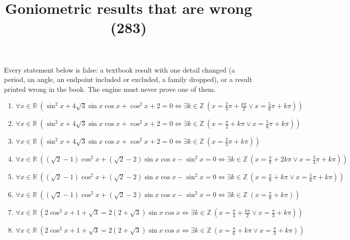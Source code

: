 \documentclass[11pt,a4paper]{article}
\title{Goniometric results that are wrong (283)}
\author{}
\date{}
\begin{document}
\maketitle
Every statement below is false: a textbook result with one detail changed (a period, an angle, an endpoint included or excluded, a family dropped), or a result printed wrong in the book. The engine must never prove one of them.

\begin{enumerate}
\item $\displaystyle \forall x \in \mathbb{R}\ \left( \sin^{2} x + 4\sqrt{3}\sin x \cos x + \cos^{2} x + 2 = 0 \iff \exists k \in \mathbb{Z}\ \left( x = \frac{2}{3}\pi + \frac{k\pi}{2} \lor x = \frac{5}{6}\pi + k\pi \right) \right)$
\item $\displaystyle \forall x \in \mathbb{R}\ \left( \sin^{2} x + 4\sqrt{3}\sin x \cos x + \cos^{2} x + 2 = 0 \iff \exists k \in \mathbb{Z}\ \left( x = \frac{\pi}{2} + k\pi \lor x = \frac{5}{6}\pi + k\pi \right) \right)$
\item $\displaystyle \forall x \in \mathbb{R}\ \left( \sin^{2} x + 4\sqrt{3}\sin x \cos x + \cos^{2} x + 2 = 0 \iff \exists k \in \mathbb{Z}\ \left( x = \frac{2}{3}\pi + k\pi \right) \right)$
\item $\displaystyle \forall x \in \mathbb{R}\ \left( (\sqrt{2} - 1)\cos^{2} x + (\sqrt{2} - 2)\sin x \cos x - \sin^{2} x = 0 \iff \exists k \in \mathbb{Z}\ \left( x = \frac{\pi}{8} + 2k\pi \lor x = \frac{3}{4}\pi + k\pi \right) \right)$
\item $\displaystyle \forall x \in \mathbb{R}\ \left( (\sqrt{2} - 1)\cos^{2} x + (\sqrt{2} - 2)\sin x \cos x - \sin^{2} x = 0 \iff \exists k \in \mathbb{Z}\ \left( x = \frac{\pi}{8} + k\pi \lor x = \frac{5}{6}\pi + k\pi \right) \right)$
\item $\displaystyle \forall x \in \mathbb{R}\ \left( (\sqrt{2} - 1)\cos^{2} x + (\sqrt{2} - 2)\sin x \cos x - \sin^{2} x = 0 \iff \exists k \in \mathbb{Z}\ \left( x = \frac{\pi}{8} + k\pi \right) \right)$
\item $\displaystyle \forall x \in \mathbb{R}\ \left( 2\cos^{2} x + 1 + \sqrt{3} = 2(2 + \sqrt{3})\sin x \cos x \iff \exists k \in \mathbb{Z}\ \left( x = \frac{\pi}{4} + \frac{k\pi}{2} \lor x = \frac{\pi}{3} + k\pi \right) \right)$
\item $\displaystyle \forall x \in \mathbb{R}\ \left( 2\cos^{2} x + 1 + \sqrt{3} = 2(2 + \sqrt{3})\sin x \cos x \iff \exists k \in \mathbb{Z}\ \left( x = \frac{\pi}{6} + k\pi \lor x = \frac{\pi}{3} + k\pi \right) \right)$

\end{enumerate}
\end{document}
